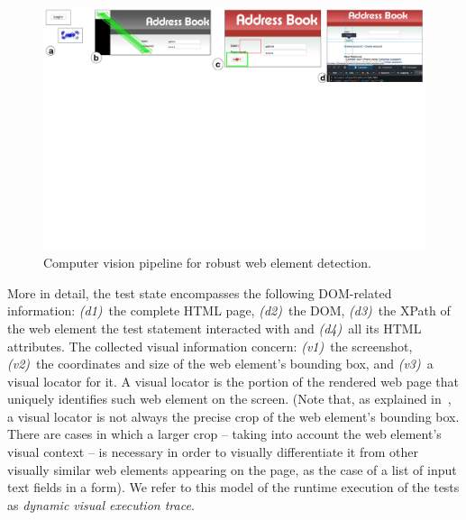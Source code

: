 
\begin{figure}[t]
\centering
\includegraphics[trim={0.3cm 17cm 0.4cm 0.3cm},clip,scale=0.44]{images/cv}
\caption{Computer vision pipeline for robust web element detection.}
\label{fig:cv}
\end{figure}

More in detail, the test state encompasses the following DOM-related information: \textit{(d1)}~the complete HTML page, \textit{(d2)}~the DOM, \textit{(d3)}~the XPath of the web element the test statement interacted with and \textit{(d4)}~all its HTML attributes. The collected visual information concern: \textit{(v1)}~the screenshot, \textit{(v2)}~the coordinates and size of the web element's bounding box, and \textit{(v3)}~a visual locator for it. A visual locator is the portion of the rendered web page that uniquely identifies such web element on the screen. (Note that, as explained in~\cite{2014-Stocco-SCAM,2015-Leotta-SAC}, a visual locator is not always the precise crop of the web element's bounding box. There are cases in which a larger crop -- taking into account the web element's visual context --  is necessary in order to visually differentiate it from other visually similar web elements appearing on the page, as the case of a list of input text fields in a form).
%
We refer to this model of the runtime execution of the tests as \textit{dynamic visual execution trace}.


